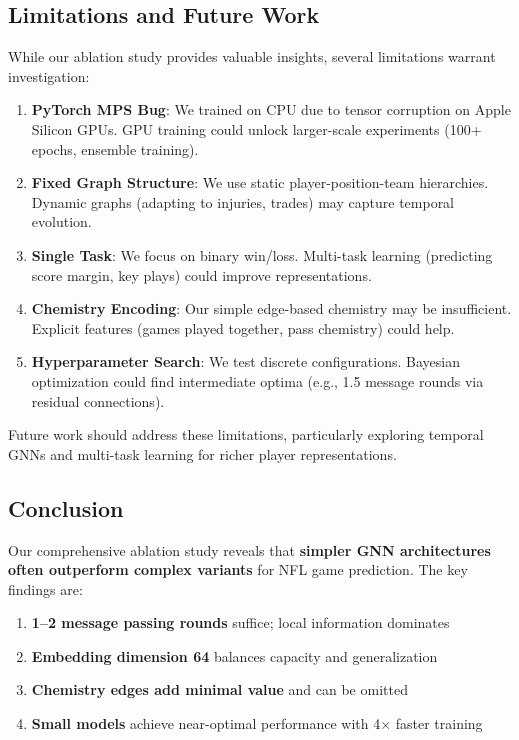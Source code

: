 {%
\subsection{Limitations and Future Work}
\label{subsec:gnn_limitations}

While our ablation study provides valuable insights, several limitations warrant investigation:

\begin{enumerate}[noitemsep]
    \item \textbf{PyTorch MPS Bug}: We trained on CPU due to tensor corruption on Apple Silicon GPUs. GPU training could unlock larger-scale experiments (100+ epochs, ensemble training).

    \item \textbf{Fixed Graph Structure}: We use static player-position-team hierarchies. Dynamic graphs (adapting to injuries, trades) may capture temporal evolution.

    \item \textbf{Single Task}: We focus on binary win/loss. Multi-task learning (predicting score margin, key plays) could improve representations.

    \item \textbf{Chemistry Encoding}: Our simple edge-based chemistry may be insufficient. Explicit features (games played together, pass chemistry) could help.

    \item \textbf{Hyperparameter Search}: We test discrete configurations. Bayesian optimization could find intermediate optima (e.g., 1.5 message rounds via residual connections).
\end{enumerate}

Future work should address these limitations, particularly exploring temporal GNNs and multi-task learning for richer player representations.

\subsection{Conclusion}
\label{subsec:gnn_ablation_conclusion}

Our comprehensive ablation study reveals that \textbf{simpler GNN architectures often outperform complex variants} for NFL game prediction. The key findings are:

\begin{enumerate}[noitemsep]
    \item \textbf{1--2 message passing rounds} suffice; local information dominates
    \item \textbf{Embedding dimension 64} balances capacity and generalization
    \item \textbf{Chemistry edges add minimal value} and can be omitted
    \item \textbf{Small models} achieve near-optimal performance with 4× faster training
\end{enumerate}

}
